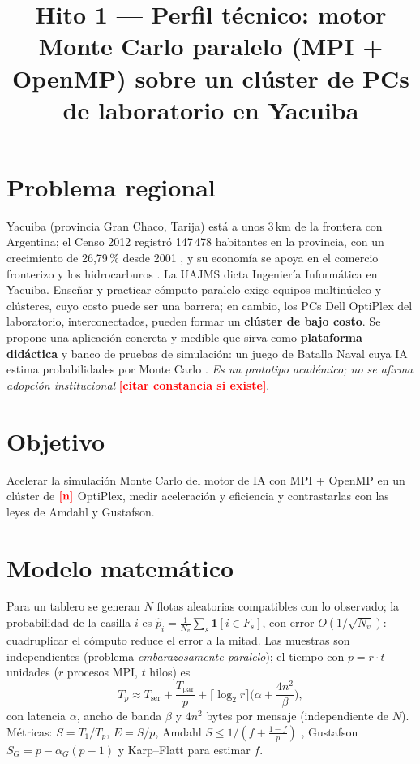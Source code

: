 \documentclass[conference]{IEEEtran}
\newcommand{\TODO}[1]{\textcolor{red}{\textbf{[#1]}}}
\begin{document}
\title{Hito 1 --- Perfil t\'ecnico: motor Monte Carlo paralelo (MPI + OpenMP) sobre un cl\'uster de PCs de laboratorio en Yacuiba}
\author{
}
\maketitle
\vspace{-1.2em}
\section{Problema regional}
Yacuiba (provincia Gran Chaco, Tarija) est\'a a unos 3\,km de la frontera con Argentina; el Censo 2012 registr\'o 147\,478 habitantes en la provincia, con un crecimiento de 26,79\,\% desde 2001 \cite{ine2014}, y su econom\'ia se apoya en el comercio fronterizo y los hidrocarburos \cite{bcb2015}. La UAJMS dicta Ingenier\'ia Inform\'atica en Yacuiba. Ense\~nar y practicar c\'omputo paralelo exige equipos multin\'ucleo y cl\'usteres, cuyo costo puede ser una barrera; en cambio, los PCs Dell OptiPlex del laboratorio, interconectados, pueden formar un \textbf{cl\'uster de bajo costo}. Se propone una aplicaci\'on concreta y medible que sirva como \textbf{plataforma did\'actica} y banco de pruebas de simulaci\'on: un juego de Batalla Naval cuya IA estima probabilidades por Monte Carlo \cite{metropolis1949}. \emph{Es un prototipo acad\'emico; no se afirma adopci\'on institucional} \TODO{citar constancia si existe}.

\section{Objetivo}
Acelerar la simulaci\'on Monte Carlo del motor de IA con MPI + OpenMP en un cl\'uster de $\TODO{n}$ OptiPlex, medir aceleraci\'on y eficiencia y contrastarlas con las leyes de Amdahl y Gustafson.

\section{Modelo matem\'atico}
Para un tablero se generan $N$ flotas aleatorias compatibles con lo observado; la probabilidad de la casilla $i$ es $\hat p_i=\frac1{N_v}\sum_s\mathbf 1[i\in F_s]$, con error $O(1/\sqrt{N_v})$: cuadruplicar el c\'omputo reduce el error a la mitad. Las muestras son independientes (problema \emph{embarazosamente paralelo}); el tiempo con $p=r\cdot t$ unidades ($r$ procesos MPI, $t$ hilos) es
\[
T_p \approx T_{\mathrm{ser}}+\frac{T_{\mathrm{par}}}{p}+\lceil\log_2 r\rceil\Big(\alpha+\frac{4n^2}{\beta}\Big),
\]
con latencia $\alpha$, ancho de banda $\beta$ y $4n^2$ bytes por mensaje (independiente de $N$). M\'etricas: $S=T_1/T_p$, $E=S/p$, Amdahl $S\le 1/(f+\frac{1-f}{p})$ \cite{amdahl1967}, Gustafson $S_G=p-\alpha_G(p-1)$ \cite{gustafson1988} y Karp--Flatt para estimar $f$.
\end{document}
